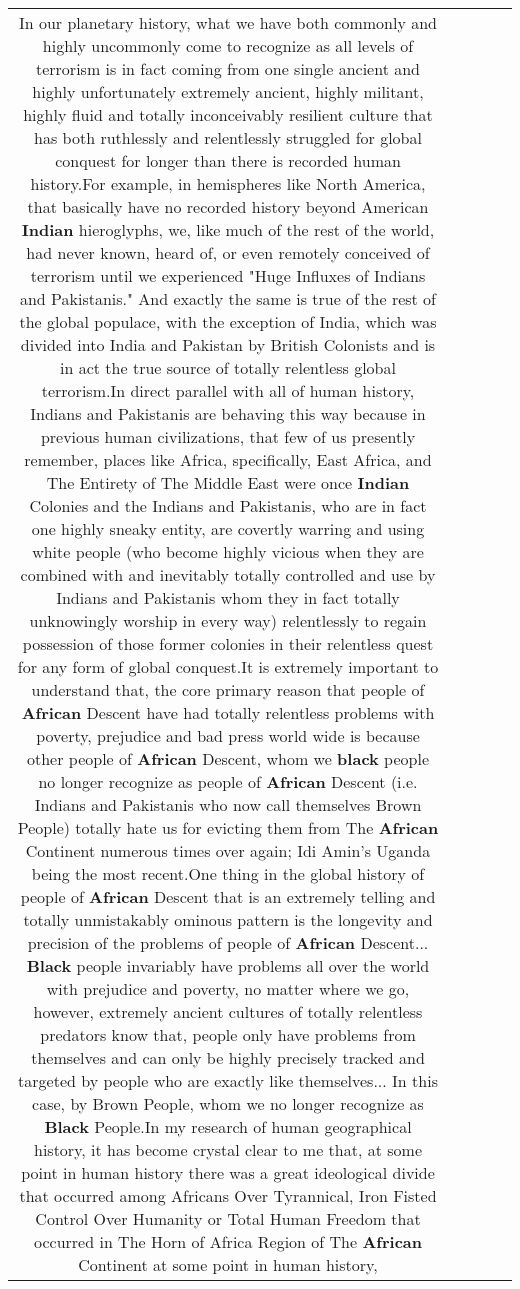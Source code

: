 \documentclass[11pt]{article}
\newlength\mylength
\begin{document}
\begin{center}
\begin{longtable}{|C{.65\mylength}|C{.30\mylength}|C{.12\mylength}|C{.12\mylength}|C{.12\mylength}|}
  \small In our planetary history, what we have both commonly and highly uncommonly come to recognize as all levels of terrorism is in fact coming from one single ancient and highly unfortunately extremely ancient, highly militant, highly fluid and totally inconceivably resilient culture that has both ruthlessly and relentlessly struggled for global conquest for longer than there is recorded human history.For example, in hemispheres like North America, that basically have no recorded history beyond American \textbf{Indian} hieroglyphs, we, like much of the rest of the world, had never known, heard of, or even remotely conceived of terrorism until we experienced "Huge Influxes of Indians and Pakistanis." And exactly the same is true of the rest of the global populace, with the exception of India, which was divided into India and Pakistan by British Colonists and is in act the true source of totally relentless global terrorism.In direct parallel with all of human history, Indians and Pakistanis are behaving this way because in previous human civilizations, that few of us presently remember, places like Africa, specifically, East Africa, and The Entirety of The Middle East were once \textbf{Indian} Colonies and the Indians and Pakistanis, who are in fact one highly sneaky entity, are covertly warring and using white people (who become highly vicious when they are combined with and inevitably totally controlled and use by Indians and Pakistanis whom they in fact totally unknowingly worship in every way) relentlessly to regain possession of those former colonies in their relentless quest for any form of global conquest.It is extremely important to understand that, the core primary reason that people of \textbf{African} Descent have had totally relentless problems with poverty, prejudice and bad press world wide is because other people of \textbf{African} Descent, whom we \textbf{black} people no longer recognize as people of \textbf{African} Descent (i.e. Indians and Pakistanis who now call themselves Brown People) totally hate us for evicting them from The \textbf{African} Continent numerous times over again; Idi Amin's Uganda being the most recent.One thing in the global history of people of \textbf{African} Descent that is an extremely telling and totally unmistakably ominous pattern is the longevity and precision of the problems of people of \textbf{African} Descent... \textbf{Black} people invariably have problems all over the world with prejudice and poverty, no matter where we go, however, extremely ancient cultures of totally relentless predators know that, people only have problems from themselves and can only be highly precisely tracked and targeted by people who are exactly like themselves... In this case, by Brown People, whom we no longer recognize as \textbf{Black} People.In my research of human geographical history, it has become crystal clear to me that, at some point in human history there was a great ideological divide that occurred among Africans Over Tyrannical, Iron Fisted Control Over Humanity or Total Human Freedom that occurred in The Horn of Africa Region of The \textbf{African} Continent at some point in human history, 
\end{longtable}
\end{center}
\end{document}

